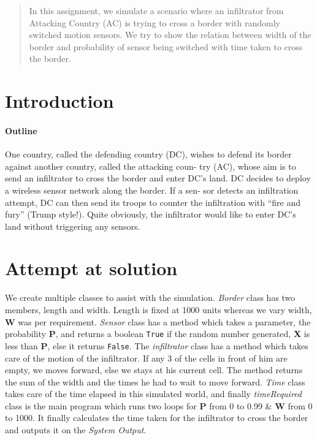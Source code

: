 \documentclass[12pt]{article}
\begin{document}
\maketitle

\begin{abstract}
In this assignment, we simulate a scenario where an infiltrator from Attacking Country (AC) 
is trying to cross a border with randomly switched motion sensors. We try to show the relation between width of the border and probability of
sensor being switched with time taken to cross the border.
\end{abstract}

\section{Introduction}
\paragraph{Outline}
One country, called the defending country (DC),
wishes to defend its border against another country, called the attacking coun-
try (AC), whose aim is to send an infiltrator to cross the border and enter DC’s
land. DC decides to deploy a wireless sensor network along the border. If a sen-
sor detects an infiltration attempt, DC can then send its troops to counter the
infiltration with “fire and fury” (Trump style!). Quite obviously, the infiltrator
would like to enter DC’s land without triggering any sensors.
\section{Attempt at solution}\label{attempt}
We create multiple classes to assist with the simulation. \textit{Border} class has two members,
length and width. Length is fixed at 1000 units whereas we vary width, \textbf{W} was per requirement. \textit{Sensor} class
has a method which takes a parameter, the probability \textbf{P}, and returns a boolean \texttt{True} if
the random number generated, \textbf{X} is less than \textbf{P}, else it returns \texttt{False}. The \textit{infiltrator}
 class has a method which takes care of the motion of the infiltrator. If any 3 of the cells in front of him are empty, we moves forward,
 else we stays at his current cell. The method returns the sum of the width and the times he had to wait to move forward.
\textit{Time} class takes care of the time elapsed in this simulated world, and finally \textit{timeRequired}
 class is the main program which runs two loops for \textbf{P} from 0 to 0.99 \& \textbf{W} from 0 to 1000. It finally calculates
 the time taken for the infiltrator to cross the border and outputs it on the \textit{System Output}.
\end{document}
